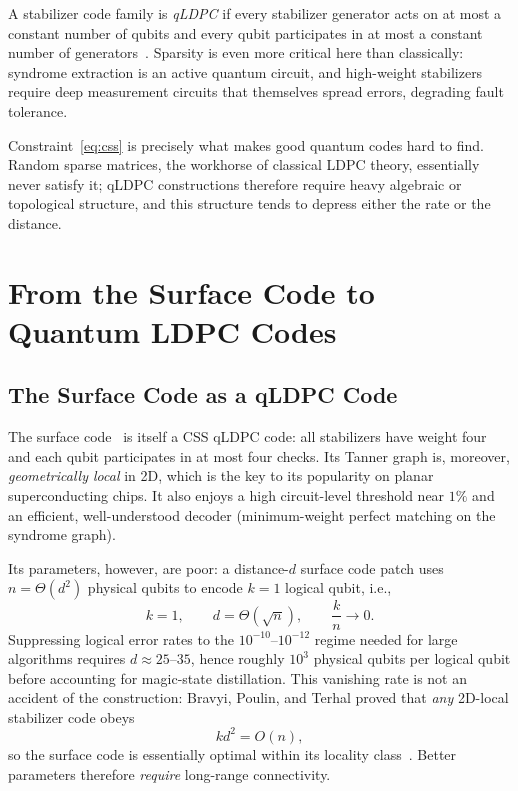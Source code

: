 \documentclass[a4paper,11pt]{quantumarticle}
\theoremstyle{definition}
\begin{document}
A stabilizer code family is \emph{qLDPC} if every stabilizer generator acts
on at most a constant number of qubits and every qubit participates in at most
a constant number of generators~\cite{breuckmann2021}. Sparsity is even more
critical here than classically: syndrome extraction is an active quantum
circuit, and high-weight stabilizers require deep measurement circuits that
themselves spread errors, degrading fault tolerance.

Constraint~\eqref{eq:css} is precisely what makes good quantum codes hard to
find. Random sparse matrices, the workhorse of classical LDPC theory,
essentially never satisfy it; qLDPC constructions therefore require heavy
algebraic or topological structure, and this structure tends to depress
either the rate or the distance.

\section{From the Surface Code to Quantum LDPC Codes}
\label{sec:qldpc}

\subsection{The Surface Code as a qLDPC Code}
\label{sec:surface}
The surface code~\cite{kitaev2003, dennis2002, fowler2012} is itself a CSS
qLDPC code: all stabilizers have weight four and each qubit participates in
at most four checks. Its Tanner graph is, moreover, \emph{geometrically
local} in 2D, which is the key to its popularity on planar superconducting
chips. It also enjoys a high circuit-level threshold near $1\%$ and an
efficient, well-understood decoder (minimum-weight perfect matching on the
syndrome graph).

Its parameters, however, are poor: a distance-$d$ surface code patch uses
$n = \Theta(d^2)$ physical qubits to encode $k = 1$ logical qubit, i.e.,
\begin{equation}
  k = 1, \qquad d = \Theta(\sqrt{n}), \qquad \frac{k}{n} \to 0 .
\end{equation}
Suppressing logical error rates to the $10^{-10}$--$10^{-12}$ regime needed
for large algorithms requires $d \approx 25$--$35$, hence roughly
$10^3$ physical qubits per logical qubit before accounting for magic-state
distillation. This vanishing rate is not an accident of the construction:
Bravyi, Poulin, and Terhal proved that \emph{any} 2D-local stabilizer code
obeys
\begin{equation}
  k d^2 = O(n),
  \label{eq:bpt}
\end{equation}
so the surface code is essentially optimal within its locality
class~\cite{bravyi2010}. Better parameters therefore \emph{require}
long-range connectivity.
\end{document}
